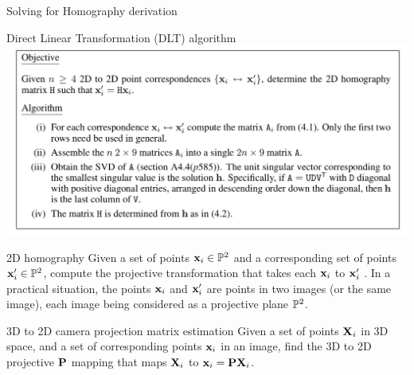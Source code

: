 \documentclass[times,t]{beamer}
\begin{document}
\begin{frame}{Solving for Homography derivation}
\end{frame}

\begin{frame}{Direct Linear Transformation   (DLT) algorithm}
  \includegraphics[width=\linewidth]{media/DLT-algorithm.png}
\end{frame}

\begin{frame}{2D homography}
  Given a set of points $\mathbf{x}_i \in \mathbb{P}^2$ and a corresponding set of
  points $\mathbf{x}'_i \in \mathbb{P}^2$, compute the projective transformation that takes each
  $\mathbf{x}_i$ to $\mathbf{x}'_i$ . In a practical situation, the points $\mathbf{x}_i$ and   $\mathbf{x}'_i$  are points in two images
  (or the same image), each image being considered as a projective plane  $\mathbb{P}^2$.
\end{frame}

\begin{frame}{3D  to  2D camera projection matrix estimation}
  Given a set of points $\mathbf{X}_i$ in 3D space, and a set
  of corresponding points $\mathbf{x}_i$ in an image, find the 3D to 2D projective
  $\mathbf{P}$ mapping
  that maps $\mathbf{X}_i$ to $\mathbf{x}_i  =  \mathbf{P}\mathbf{X}_i$.
\end{frame}
\end{document}
